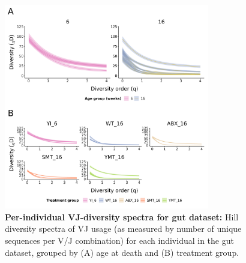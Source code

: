 \begin{figure}
\centering
\begin{subfigure}{0em}
\label{fig:igseq-gut-vj-diversity-solo-spectra-age}
\end{subfigure}
\begin{subfigure}{0em}
\label{fig:igseq-gut-vj-diversity-solo-spectra-groups}
\end{subfigure}
\includegraphics[width = 0.8\textwidth]{_Figures/png/igseq-gut-VJ-diversity-solo-spectra}
\caption[Per-individual VJ-diversity spectra for gut dataset]{\textbf{Per-individual VJ-diversity spectra for gut dataset:} Hill diversity spectra of VJ usage (as measured by number of unique sequences per V/J combination) for each individual in the \igseq gut dataset, grouped by (A) age at death and (B) treatment group.}
\label{fig:igseq-gut-vj-diversity-solo-spectra}
\end{figure}
